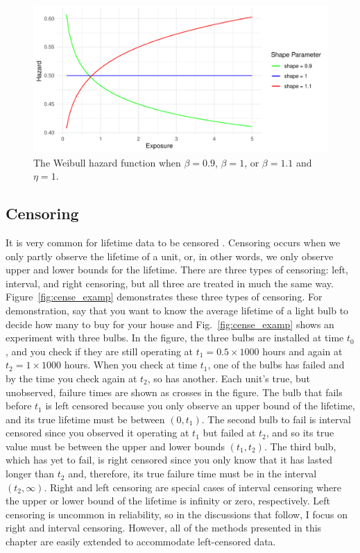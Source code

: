\begin{figure}[h]
    \centering
    \includegraphics[width=1\textwidth]{./figures/ch-2/hazard_func_demo.pdf}
    \caption{The Weibull hazard function when $\beta = 0.9$, $\beta = 1$, or $\beta = 1.1$ and $\eta = 1$.}
    \label{fig:hazard_function_demo}
\end{figure}

\subsection{Censoring} \label{subsec:censoring-treatments}

It is very common for lifetime data to be censored \citep{tian2024}. Censoring occurs when we only partly observe the lifetime of a unit, or, in other words, we only observe upper and lower bounds for the lifetime. There are three types of censoring: left, interval, and right censoring, but all three are treated in much the same way. Figure~\ref{fig:cense_examp} demonstrates these three types of censoring. For demonstration, say that you want to know the average lifetime of a light bulb to decide how many to buy for your house and Fig.~\ref{fig:cense_examp} shows an experiment with three bulbs. In the figure, the three bulbs are installed at time $t_0$, and you check if they are still operating at $t_1 = 0.5 \times 1000$ hours and again at $t_2 = 1 \times 1000$ hours. When you check at time $t_1$, one of the bulbs has failed and by the time you check again at $t_2$, so has another. Each unit's true, but unobserved, failure times are shown as crosses in the figure. The bulb that fails before $t_1$ is left censored because you only observe an upper bound of the lifetime, and its true lifetime must be between $(0, t_1)$. The second bulb to fail is interval censored since you observed it operating at $t_1$ but failed at $t_2$, and so its true value must be between the upper and lower bounds $(t_1, t_2)$. The third bulb, which has yet to fail, is right censored since you only know that it has lasted longer than $t_2$ and, therefore, its true failure time must be in the interval $(t_2, \infty)$. Right and left censoring are special cases of interval censoring where the upper or lower bound of the lifetime is infinity or zero, respectively. Left censoring is uncommon in reliability, so in the discussions that follow, I focus on right and interval censoring. However, all of the methods presented in this chapter are easily extended to accommodate left-censored data.

